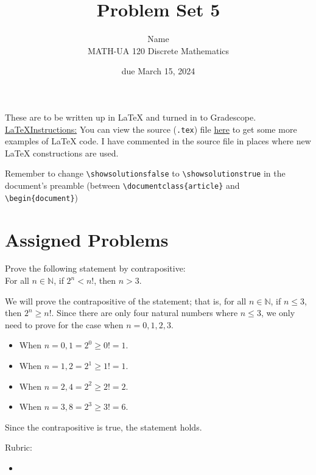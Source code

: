 \documentclass{article}
\title{Problem Set 5}
\author{%
    Name
\\  MATH-UA 120 Discrete Mathematics
}
\date{due March 15, 2024}
\newif\ifshowsolutions
\newcommand{\danger}{\marginpar[\hfill\dbend]{\dbend\hfill}}
\theoremstyle{definition}
\begin{document}
\maketitle



These are to be written up in \LaTeX{} and turned in to Gradescope.\\



\ifshowsolutions
    \SetupExSheets{solution/print=true}
\else
    \danger
 \underline{ \LaTeX  Instructions:}  You can view the source (\texttt{.tex}) file \href{}{here} to get some more examples of \LaTeX{} code.  I have commented in the source file in places where new \LaTeX{} constructions are used.
  
  Remember to change \verb|\showsolutionsfalse| to \verb|\showsolutionstrue|
    in the document's preamble 
    (between \verb|\documentclass{article}| and \verb|\begin{document}|)
\fi

\section*{Assigned Problems}

\begin{question}{5}
    Prove the following statement by contrapositive: \\
    For all $n\in \mathbb{N}$, if $2^n<n!$, then $n>3$.
\end{question}
\begin{solution}
We will prove the contrapositive of the statement; that is, for all $n\in \mathbb{N}$, if $n\leq 3$, then $2^n\geq n!$. Since there are only four natural numbers where $n\leq 3$, we only need to prove for the case when $n=0, 1, 2, 3$.
\begin{itemize}
\item When $n=0, 1 = 2^0 \geq 0!=1.$
\item When $n=1, 2 = 2^1 \geq 1!=1.$
\item When $n=2, 4 = 2^2 \geq 2!=2.$
\item When $n=3, 8 = 2^3 \geq 3!=6.$
\end{itemize}
Since the contrapositive is true, the statement holds.

{\color{red} Rubric:
\begin{itemize}
\item 
\end{itemize}}
\end{solution}
\end{document}
